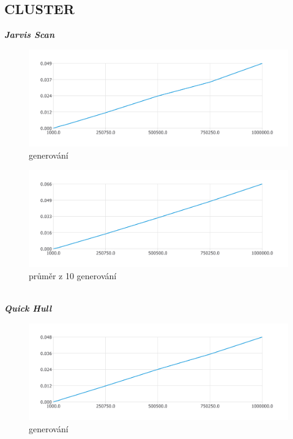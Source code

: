 \documentclass{article}
\begin{document}
\subsection{CLUSTER}
\textit{\textbf {Jarvis Scan}}
\\
\begin{figure}[htbp]
\centering
        \includegraphics[clip, trim=0cm 0cm 0cm 0cm, width=1\textwidth]{pdf19.pdf}
        \caption{generování}
\end{figure}
\begin{figure}[htbp]
\centering
        \includegraphics[clip, trim=0cm 0cm 0cm 0cm, width=1\textwidth]{clj.pdf}
        \caption{průměr z 10 generování}
\end{figure}
\\
\clearpage
\newpage
\textit{\textbf {Quick Hull}}
\\
\begin{figure}[htbp]
\centering
        \includegraphics[clip, trim=0cm 0cm 0cm 0cm, width=1\textwidth]{pdf22.pdf}
        \caption{generování}
\end{figure}
\end{document}

